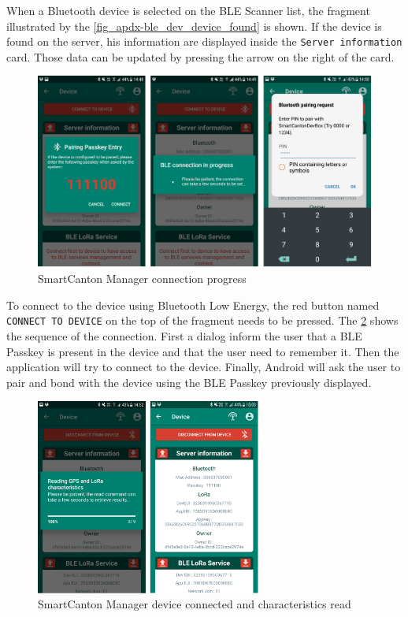 When a Bluetooth device is selected on the BLE Scanner list, the fragment illustrated by the \cref{fig_apdx-ble_dev_device_found} is shown. If the device is found on the server, his information are displayed inside the \texttt{Server information} card. Those data can be updated by pressing the arrow on the right of the card.

\begin{figure}[ht!]
    \centering
    \includegraphics[width=1.0\textwidth]{Figures/Appendixes/Android/ble_dev_connection_process.png}
    \caption{SmartCanton Manager connection progress}
    \label{fig_apdx-ble_dev_connection_process}
\end{figure}

To connect to the device using Bluetooth Low Energy, the red button named \texttt{CONNECT TO DEVICE} on the top of the fragment needs to be pressed. The \cref{fig_apdx-ble_dev_connected_startup} shows the sequence of the connection. First a dialog inform the user that a BLE Passkey is present in the device and that the user need to remember it. Then the application will try to connect to the device. Finally, Android will ask the user to pair and bond with the device using the BLE Passkey previously displayed.


\begin{figure}[ht!]
    \centering
    \includegraphics[width=0.66\textwidth]{Figures/Appendixes/Android/ble_dev_connected_startup.png}
    \caption{SmartCanton Manager device connected and characteristics read}
    \label{fig_apdx-ble_dev_connected_startup}
\end{figure}

